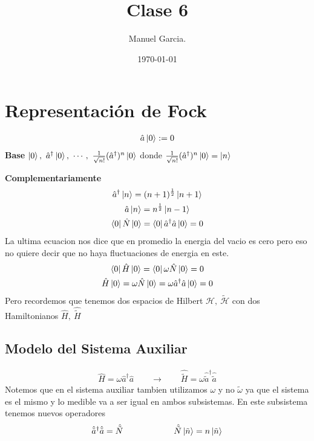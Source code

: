 \documentclass{article}
\title{Clase 6 }
\author{Manuel Garcia.}
\date{\today}
\begin{document}
\maketitle

\section{Representación de Fock }
\begin{gather*}
  \hat a \ket{0 } := 0 
\end{gather*}
\textbf{Base } $ \ket{0 },\ \hat a ^ {\dagger } \ket{0 } , \ \cdots,\  \frac{1}{\sqrt{n! } }(\hat a ^ {\dagger })^n \ket{0 } $ donde $ \frac{1}{\sqrt{n! } }(\hat a ^ {\dagger })^n \ket{0 } = \ket{n } $

\hfill 

\hfill 

\textbf{Complementariamente }
\begin{gather*}
  \hat a ^ {\dagger } \ket{n } = (n+1)^ {\frac{1}{2}} \ket{n+1 }\\
  \hat a \ket{n } = n ^ {\frac{1}{2}} \ket{n - 1 }\\
  \bra{0 }\hat N \ket{0 } = \bra{0 }\hat a ^ {\dagger } \hat a \ket{0 } = 0  
\end{gather*}
La ultima ecuacion nos dice que en promedio la energia del vacio es cero pero eso no quiere decir que no haya fluctuaciones de energia en este.
\begin{gather*}
  \bra{0 }\hat H \ket{0 } = \bra{0 }\omega \hat N \ket{0 } = 0 \\
  \hat H \ket{0 } = \omega\hat N \ket{0 } = \omega \hat a ^ {\dagger }\hat a \ket{0 } = 0 
\end{gather*}
Pero recordemos que tenemos dos espacios de Hilbert $ \mathcal H, \ \tilde{\mathcal H} $ con dos Hamiltonianos $ \hat H , \ \hat{\tilde H} $

\subsection{Modelo del Sistema Auxiliar }
\begin{gather*}
  \hat H = \omega \hat a ^ {\dagger } \hat a \qquad \rightarrow \qquad \hat{\tilde H } = \omega \hat{\tilde a }^ {\dagger } \hat{\tilde a}
\end{gather*}
Notemos que en el sistema auxiliar tambien utilizamos $ \omega $ y no $ \tilde \omega $ ya que el sistema es el mismo y lo medible va a ser igual en ambos subsistemas. En este subsistema tenemos nuevos operadores 
\begin{gather*}
  \hat{\tilde a } ^ {\dagger } \hat{\tilde a} = \hat{\tilde N } \qquad \qquad \qquad \hat{\tilde N  } \ket{\tilde n } = n \ket{\tilde n }
\end{gather*}
\end{document}
